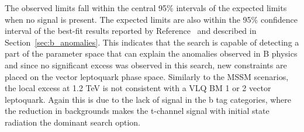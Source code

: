 The observed limits fall within the central 95\% intervals of the expected limits when no signal is present. 
The expected limits are also within the 95\% confidence interval of the best-fit results reported by Reference~\cite{Cornella:2021sby} and described in Section~\ref{sec:b_anomalies}.
This indicates that the search is capable of detecting a part of the parameter space that can explain the anomalies observed in B physics and since no significant excess was observed in this search, new constraints are placed on the vector leptoquark phase space.
Similarly to the \ac{MSSM} scenarios, the local excess at 1.2 TeV is not consistent with a VLQ BM 1 or 2 vector leptoquark.
Again this is due to the lack of signal in the b tag categories, where the reduction in backgrounds makes the t-channel signal with initial state radiation the dominant search option.


